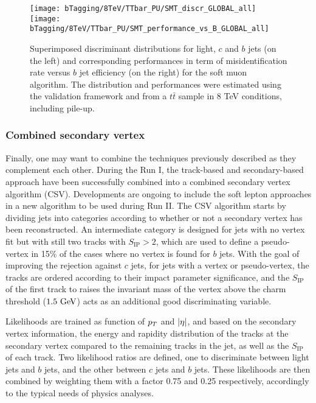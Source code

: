     \begin{figure}[th!]
        \centering
        \begin{minipage}{\textwidth}
        \texttt{[image: bTagging/8TeV/TTbar\_PU/SMT\_discr\_GLOBAL\_all]}
        \texttt{[image: bTagging/8TeV/TTbar\_PU/SMT\_performance\_vs\_B\_GLOBAL\_all]}
        \end{minipage}
        \caption{Superimposed discriminant distributions for light, $c$ and $b$ jets (on
        the left) and corresponding performances in term of misidentification rate versus $b$ jet efficiency
        (on the right) for the soft muon algorithm.
        The distribution and performances were estimated using the validation framework and from
        a $t\bar{t}$ sample in 8 TeV conditions, including pile-up.}
        \label{fig:bTagging/perfSMT}
    \end{figure}

        \subsubsection{Combined secondary vertex}

    Finally, one may want to combine the techniques previously described as they complement
    each other. During the Run I, the track-based and secondary-based approach have been
    successfully combined into a combined secondary vertex algorithm (CSV). Developments are ongoing
    to include the soft lepton approaches in a new algorithm to be used during Run II.
    The CSV algorithm starts by dividing jets into categories according to whether or not a secondary
    vertex has been reconstructed. An intermediate category is designed for jets
    with no vertex fit but with still two tracks with $S_\text{IP} > 2$, which are used to
    define a pseudo-vertex in 15\% of the cases where no vertex is found for $b$ jets.
    With the goal of improving the rejection against $c$ jets, for jets with a vertex or pseudo-vertex,
    the tracks are ordered according to their impact parameter significance, and the
    $S_\text{IP}$ of the first track to raises the invariant mass of the vertex above
    the charm threshold ($1.5 ~\text{GeV}$) acts as an additional good discriminating variable.

    Likelihoods are trained as function of $p_T$ and $\left| \eta \right|$, and based on the secondary vertex information, the energy
    and rapidity distribution of the tracks at the secondary vertex compared to the remaining
    tracks in the jet, as well as the $S_\text{IP}$ of each track. Two likelihood ratios
    are defined, one to discriminate between light jets and $b$ jets, and the other between
    $c$ jets and $b$ jets.
    These likelihoods are then combined by weighting them with a factor 0.75 and 0.25
    respectively, accordingly to the typical needs of physics analyses.

